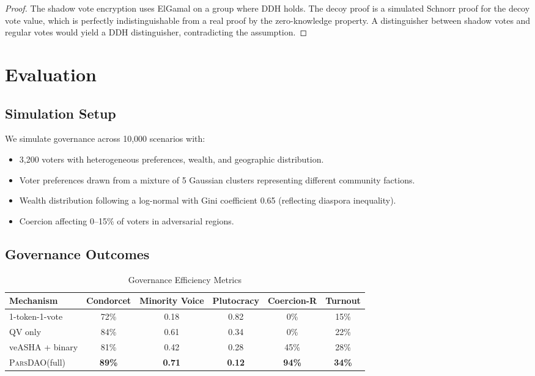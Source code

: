 \documentclass[11pt,a4paper]{article}
\newcommand{\parsdao}{\textsc{ParsDAO}\xspace}
\begin{document}
\begin{proof}
The shadow vote encryption uses ElGamal on a group where DDH holds. The decoy proof is a simulated Schnorr proof for the decoy vote value, which is perfectly indistinguishable from a real proof by the zero-knowledge property. A distinguisher between shadow votes and regular votes would yield a DDH distinguisher, contradicting the assumption.
\end{proof}

\section{Evaluation}

\subsection{Simulation Setup}

We simulate governance across 10{,}000 scenarios with:

\begin{itemize}
    \item 3{,}200 voters with heterogeneous preferences, wealth, and geographic distribution.
    \item Voter preferences drawn from a mixture of 5 Gaussian clusters representing different community factions.
    \item Wealth distribution following a log-normal with Gini coefficient 0.65 (reflecting diaspora inequality).
    \item Coercion affecting 0--15\% of voters in adversarial regions.
\end{itemize}

\subsection{Governance Outcomes}

\begin{table}[H]
\centering
\caption{Governance Efficiency Metrics}
\label{tab:efficiency}
\begin{tabular}{lccccc}
\toprule
\textbf{Mechanism} & \textbf{Condorcet} & \textbf{Minority Voice} & \textbf{Plutocracy} & \textbf{Coercion-R} & \textbf{Turnout} \\
\midrule
1-token-1-vote & 72\% & 0.18 & 0.82 & 0\% & 15\% \\
QV only & 84\% & 0.61 & 0.34 & 0\% & 22\% \\
veASHA + binary & 81\% & 0.42 & 0.28 & 45\% & 28\% \\
\parsdao (full) & \textbf{89\%} & \textbf{0.71} & \textbf{0.12} & \textbf{94\%} & \textbf{34\%} \\
\bottomrule
\end{tabular}
\end{table}
\end{document}
